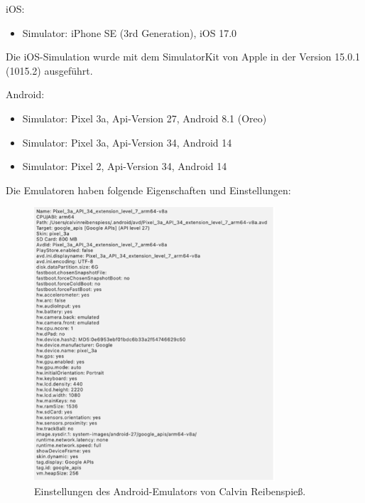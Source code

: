 iOS:

\begin{itemize}
  \item Simulator: iPhone SE (3rd Generation), iOS 17.0
\end{itemize}

Die iOS-Simulation wurde mit dem SimulatorKit von Apple in der Version 15.0.1 (1015.2) ausgeführt.

Android:

\begin{itemize}
  \item Simulator: Pixel 3a, Api-Version 27, Android 8.1 (Oreo)
  \item Simulator: Pixel 3a, Api-Version 34, Android 14
  \item Simulator: Pixel 2, Api-Version 34, Android 14
\end{itemize}

Die Emulatoren haben folgende Eigenschaften und Einstellungen:

\begin{figure}[H]
    \centering
    \includegraphics[width=0.8\textwidth]{images/android_emulator_reibenspiess.png}
    \caption{Einstellungen des Android-Emulators von Calvin Reibenspieß.}
    \label{branding}
\end{figure}


